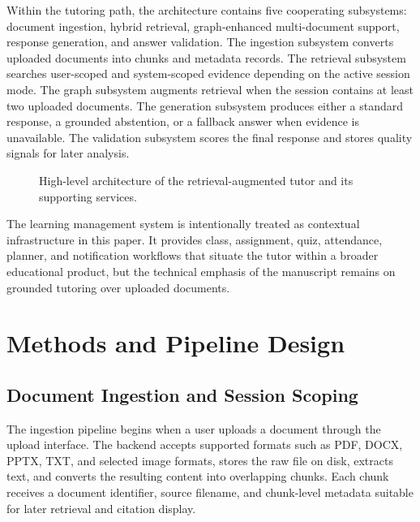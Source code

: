 \documentclass[11pt,a4paper]{article}
\begin{document}
Within the tutoring path, the architecture contains five cooperating subsystems: document ingestion, hybrid retrieval, graph-enhanced multi-document support, response generation, and answer validation. The ingestion subsystem converts uploaded documents into chunks and metadata records. The retrieval subsystem searches user-scoped and system-scoped evidence depending on the active session mode. The graph subsystem augments retrieval when the session contains at least two uploaded documents. The generation subsystem produces either a standard response, a grounded abstention, or a fallback answer when evidence is unavailable. The validation subsystem scores the final response and stores quality signals for later analysis.

\begin{figure}[h!]
\centering
{}
\caption{High-level architecture of the retrieval-augmented tutor and its supporting services.}
\label{fig:architecture}
\end{figure}

The learning management system is intentionally treated as contextual infrastructure in this paper. It provides class, assignment, quiz, attendance, planner, and notification workflows that situate the tutor within a broader educational product, but the technical emphasis of the manuscript remains on grounded tutoring over uploaded documents.

\section{Methods and Pipeline Design}

\subsection{Document Ingestion and Session Scoping}

The ingestion pipeline begins when a user uploads a document through the upload interface. The backend accepts supported formats such as PDF, DOCX, PPTX, TXT, and selected image formats, stores the raw file on disk, extracts text, and converts the resulting content into overlapping chunks. Each chunk receives a document identifier, source filename, and chunk-level metadata suitable for later retrieval and citation display.
\end{document}
